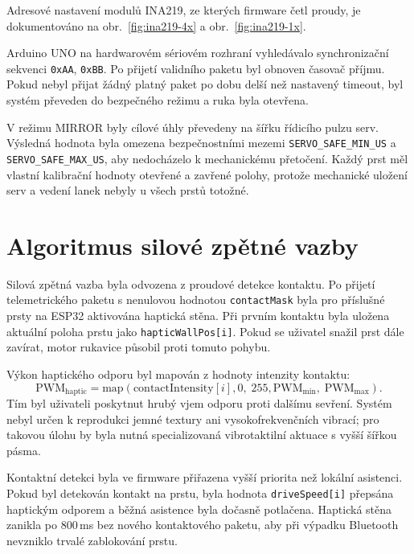 \documentclass[FZS,DP]{tulthesis}
\begin{document}
Adresové nastavení modulů INA219, ze kterých firmware četl proudy, je dokumentováno na obr.~\ref{fig:ina219-4x} a obr.~\ref{fig:ina219-1x}.

Arduino UNO na hardwarovém sériovém rozhraní vyhledávalo synchronizační sekvenci \texttt{0xAA}, \texttt{0xBB}. Po přijetí validního paketu byl obnoven časovač příjmu. Pokud nebyl přijat žádný platný paket po dobu delší než nastavený timeout, byl systém převeden do bezpečného režimu a ruka byla otevřena.

V režimu MIRROR byly cílové úhly převedeny na šířku řídicího pulzu serv. Výsledná hodnota byla omezena bezpečnostními mezemi \texttt{SERVO\_SAFE\_MIN\_US} a \texttt{SERVO\_SAFE\_MAX\_US}, aby nedocházelo k mechanickému přetočení. Každý prst měl vlastní kalibrační hodnoty otevřené a zavřené polohy, protože mechanické uložení serv a vedení lanek nebyly u všech prstů totožné.

\section{Algoritmus silové zpětné vazby}
\label{sec:algoritmus-force-feedback}

Silová zpětná vazba byla odvozena z proudové detekce kontaktu. Po přijetí telemetrického paketu s nenulovou hodnotou \texttt{contactMask} byla pro příslušné prsty na ESP32 aktivována haptická stěna. Při prvním kontaktu byla uložena aktuální poloha prstu jako \texttt{hapticWallPos[i]}. Pokud se uživatel snažil prst dále zavírat, motor rukavice působil proti tomuto pohybu.

Výkon haptického odporu byl mapován z hodnoty intenzity kontaktu:
\begin{equation}
    \mathrm{PWM}_{\mathrm{haptic}} =
    \mathrm{map}\left(
        \mathrm{contactIntensity}[i],
        0,\;255,
        \mathrm{PWM}_{\min},\;\mathrm{PWM}_{\max}
    \right).
\end{equation}
Tím byl uživateli poskytnut hrubý vjem odporu proti dalšímu sevření. Systém nebyl určen k reprodukci jemné textury ani vysokofrekvenčních vibrací; pro takovou úlohu by byla nutná specializovaná vibrotaktilní aktuace s vyšší šířkou pásma.

Kontaktní detekci byla ve firmware přiřazena vyšší priorita než lokální asistenci. Pokud byl detekován kontakt na prstu, byla hodnota \texttt{driveSpeed[i]} přepsána haptickým odporem a běžná asistence byla dočasně potlačena. Haptická stěna zanikla po 800\,ms bez nového kontaktového paketu, aby při výpadku Bluetooth nevzniklo trvalé zablokování prstu.
\end{document}
